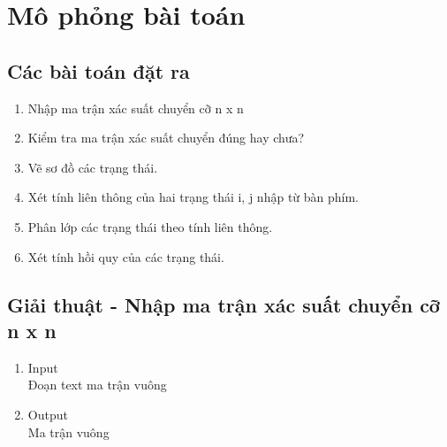 \chapter{Mô phỏng bài toán}
\thispagestyle{empty}

\section{Các bài toán đặt ra}
	\begin{enumerate}
  		\item Nhập ma trận xác suất chuyển cỡ n x n
  		\item Kiểm tra ma trận xác suất chuyển đúng hay chưa?
  		\item Vẽ sơ đồ các trạng thái.
  		\item Xét tính liên thông của hai trạng thái i, j nhập từ bàn phím.
		\item Phân lớp các trạng thái theo tính liên thông.
		\item Xét tính hồi quy của các trạng thái.
	\end{enumerate}







\section{Giải thuật - Nhập ma trận xác suất chuyển cỡ n x n}
	\begin{enumerate}
  		\item Input \\
  			Đoạn text ma trận vuông
  		\item Output \\
  			Ma trận vuông
	\end{enumerate}






